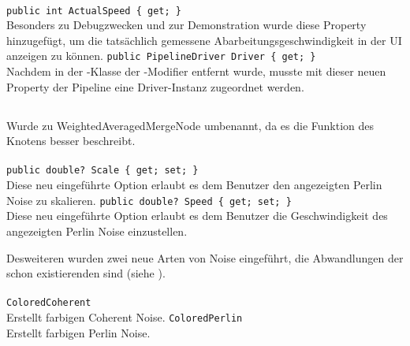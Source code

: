 \paragraph{}
\begin{itemize}
	\add \verb!public int ActualSpeed { get; }! \\
	Besonders zu Debugzwecken und zur Demonstration wurde diese Property hinzugefügt, um die tatsächlich gemessene Abarbeitungsgeschwindigkeit in der UI anzeigen zu können.
	\add \verb!public PipelineDriver Driver { get; }! \\
	Nachdem in der -Klasse der -Modifier entfernt wurde, musste mit dieser neuen Property der Pipeline eine Driver-Instanz zugeordnet werden.
\end{itemize}


\subsection{}

\paragraph{}
\begin{itemize}
	\change Wurde zu WeightedAveragedMergeNode umbenannt, da es die Funktion des Knotens besser beschreibt.
\end{itemize}

\paragraph{}
\begin{itemize}
	\add \verb!public double? Scale { get; set; }! \\
	Diese neu eingeführte Option erlaubt es dem Benutzer den angezeigten Perlin Noise zu skalieren.
	\add \verb!public double? Speed { get; set; }! \\
	Diese neu eingeführte Option erlaubt es dem Benutzer die Geschwindigkeit des angezeigten Perlin Noise einzustellen.
\end{itemize}

Desweiteren wurden zwei neue Arten von Noise eingeführt, die Abwandlungen der schon existierenden sind (siehe ).

\paragraph{}
\begin{itemize}
	\add \verb!ColoredCoherent! \\
	Erstellt farbigen Coherent Noise.
	\add \verb!ColoredPerlin! \\
	Erstellt farbigen Perlin Noise.
\end{itemize}

